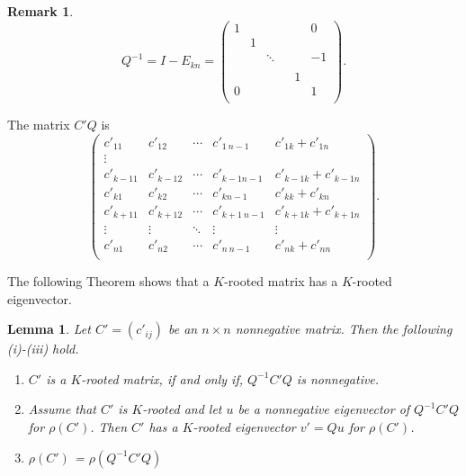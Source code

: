 \documentclass{article}
\theoremstyle{plain}
\newtheorem{lem}[thm]{Lemma}
\theoremstyle{definition}
\newtheorem{rem}[thm]{Remark}
\begin{document}
\begin{rem}

    $$Q^{-1}=I-E_{kn}=\begin{pmatrix}
    1 &  & & &  & 0 \\
    & 1 &  &      &  &  \\
    &  & \ddots & &  & -1 \\
    &  &        & &  &  \\
    &  & & & 1 &  \\
    0 &  & & &  & 1 \\
    \end{pmatrix}.$$

    The matrix $C'Q$ is
    $$\begin{pmatrix}
    c'_{11}     & c'_{12} & \cdots     & c'_{1\ n-1} & c'_{1k}+c'_{1n} \\
    \vdots \\
    c'_{k-11}     & c'_{k-1 2}           & \cdots     & c'_{k-1 n-1} & c'_{k-1k}+c'_{k-1n} \\
    c'_{k1} & c'_{k2} &\cdots      & c'_{kn-1} & c'_{kk}+c'_{kn}\\
    c'_{k+11}     & c'_{k+12}           & \cdots     & c'_{k+1\ n-1} & c'_{k+1k}+c'_{k+1n} \\
    \vdots              & \vdots & \ddots              & \vdots & \vdots \\
    c'_{n1}             & c'_{n2} & \cdots             & c'_{n\ n-1} & c'_{nk}+c'_{nn} \\
    \end{pmatrix}.
    $$
\end{rem}

The following Theorem shows that a $K$-rooted matrix has a $K$-rooted eigenvector.
\begin{lem}\label{lma_m_rooted}
    Let $C'=(c'_{ij})$ be an $n\times n$ nonnegative matrix. Then the following (i)-(iii) hold.
        \begin{enumerate}[label=(\roman*)]
            \item \label{lma_m_rooted_cond1} $C'$ is a $K$-rooted matrix, if and only if, $Q^{-1}C'Q$ is nonnegative.
            \item \label{lma_m_rooted_cond2}Assume that $C'$ is $K$-rooted and let $u$ be a nonnegative eigenvector of $Q^{-1}C'Q$
                for $\rho(C')$. Then  $C'$ has a $K$-rooted eigenvector $v'=Qu$ for $\rho(C')$. 
            \item \label{lma_m_rooted_cond3}$\rho(C')$ = $\rho(Q^{-1}C'Q)$
        \end{enumerate}
\end{lem}
  
\end{document}
